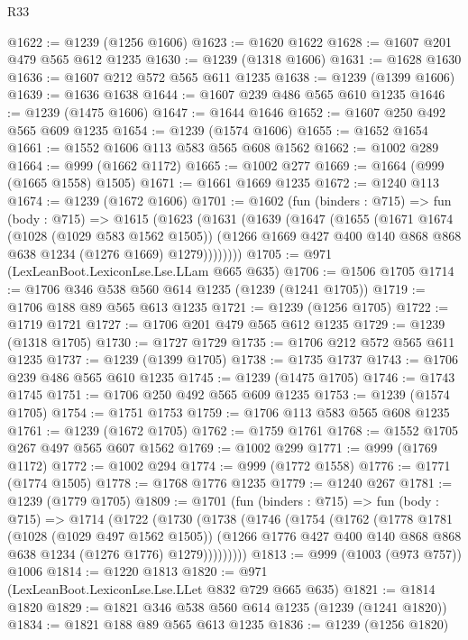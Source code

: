\begin{lexlean}{R33}
\begin{coremodule}
@1622 := @1239 (@1256 @1606)
@1623 := @1620 @1622
@1628 := @1607 @201 @479 @565 @612 @1235
@1630 := @1239 (@1318 @1606)
@1631 := @1628 @1630
@1636 := @1607 @212 @572 @565 @611 @1235
@1638 := @1239 (@1399 @1606)
@1639 := @1636 @1638
@1644 := @1607 @239 @486 @565 @610 @1235
@1646 := @1239 (@1475 @1606)
@1647 := @1644 @1646
@1652 := @1607 @250 @492 @565 @609 @1235
@1654 := @1239 (@1574 @1606)
@1655 := @1652 @1654
@1661 := @1552 @1606 @113 @583 @565 @608 @1562
@1662 := @1002 @289
@1664 := @999 (@1662 @1172)
@1665 := @1002 @277
@1669 := @1664 (@999 (@1665 @1558) @1505)
@1671 := @1661 @1669 @1235
@1672 := @1240 @113
@1674 := @1239 (@1672 @1606)
@1701 := @1602
    (fun (binders : @715) =>
    fun (body : @715) =>
    @1615
      (@1623
        (@1631
          (@1639
            (@1647
              (@1655
                (@1671
                  @1674
                  (@1028 (@1029 @583 @1562 @1505))
                  (@1266 @1669 @427 @400 @140 @868 @868 @638 @1234 (@1276 @1669) @1279))))))))
@1705 := @971 (LexLeanBoot.LexiconLse.Lse.LLam @665 @635)
@1706 := @1506 @1705
@1714 := @1706 @346 @538 @560 @614 @1235 (@1239 (@1241 @1705))
@1719 := @1706 @188 @89 @565 @613 @1235
@1721 := @1239 (@1256 @1705)
@1722 := @1719 @1721
@1727 := @1706 @201 @479 @565 @612 @1235
@1729 := @1239 (@1318 @1705)
@1730 := @1727 @1729
@1735 := @1706 @212 @572 @565 @611 @1235
@1737 := @1239 (@1399 @1705)
@1738 := @1735 @1737
@1743 := @1706 @239 @486 @565 @610 @1235
@1745 := @1239 (@1475 @1705)
@1746 := @1743 @1745
@1751 := @1706 @250 @492 @565 @609 @1235
@1753 := @1239 (@1574 @1705)
@1754 := @1751 @1753
@1759 := @1706 @113 @583 @565 @608 @1235
@1761 := @1239 (@1672 @1705)
@1762 := @1759 @1761
@1768 := @1552 @1705 @267 @497 @565 @607 @1562
@1769 := @1002 @299
@1771 := @999 (@1769 @1172)
@1772 := @1002 @294
@1774 := @999 (@1772 @1558)
@1776 := @1771 (@1774 @1505)
@1778 := @1768 @1776 @1235
@1779 := @1240 @267
@1781 := @1239 (@1779 @1705)
@1809 := @1701
    (fun (binders : @715) =>
    fun (body : @715) =>
    @1714
      (@1722
        (@1730
          (@1738
            (@1746
              (@1754
                (@1762
                  (@1778
                    @1781
                    (@1028 (@1029 @497 @1562 @1505))
                    (@1266 @1776 @427 @400 @140 @868 @868 @638 @1234 (@1276 @1776) @1279)))))))))
@1813 := @999 (@1003 (@973 @757)) @1006
@1814 := @1220 @1813
@1820 := @971 (LexLeanBoot.LexiconLse.Lse.LLet @832 @729 @665 @635)
@1821 := @1814 @1820
@1829 := @1821 @346 @538 @560 @614 @1235 (@1239 (@1241 @1820))
@1834 := @1821 @188 @89 @565 @613 @1235
@1836 := @1239 (@1256 @1820)

\end{coremodule}
\end{lexlean}
